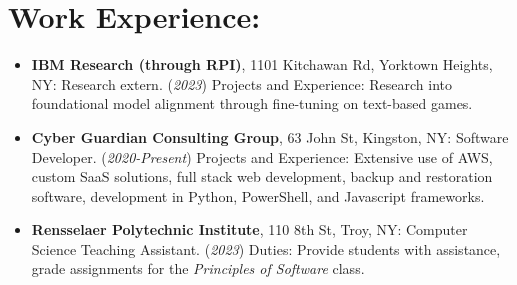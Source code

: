 \section*{Work Experience:}
\begin{itemize}
    \itemsep0em 
    \item \textbf{IBM Research (through RPI)}, 1101 Kitchawan Rd, Yorktown Heights, NY: Research extern. (\textit{2023}) Projects and Experience: Research into foundational model alignment through fine-tuning on text-based games.
    
    \item \textbf{Cyber Guardian Consulting Group}, 63 John St, Kingston, NY: Software Developer. (\textit{2020-Present}) Projects and Experience: Extensive use of AWS, custom SaaS solutions, full stack web development, backup and restoration software, development in Python, PowerShell, and Javascript frameworks.
    
    \item \textbf{Rensselaer Polytechnic Institute}, 110 8th St, Troy, NY: Computer Science Teaching Assistant. (\textit{2023}) Duties: Provide students with assistance, grade assignments for the \textit{Principles of Software} class.
\end{itemize}
